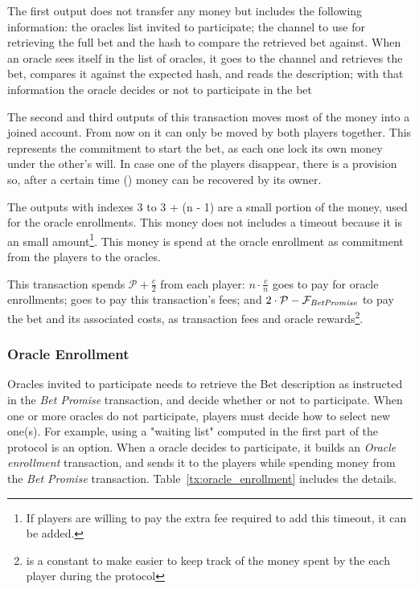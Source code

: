 The first output does not transfer any money but includes the following
  information: the oracles list invited to participate; the channel to use for
  retrieving the full bet and the hash to compare the retrieved bet against.
When an oracle sees itself in the list of oracles, it goes to the channel and
  retrieves the bet, compares it against the expected hash, and reads the
  description; with that information the oracle decides or not to participate
  in the bet

The second and third outputs of this transaction moves most of the money into
  a joined account. From now on it can only be moved by both players
  together.
This represents the commitment to start the bet, as each one lock its own money
  under the other's will.
In case one of the players disappear, there is a provision so, after a certain
  time () money can be recovered by its owner.

The outputs with indexes 3 to 3 + (n - 1) are a small portion of the money, used
  for the oracle enrollments.
This money does not includes a timeout because it is an small amount\footnote{If
  players are willing to pay the extra fee required to add this timeout, it can
  be added.}.
This money is spend at the oracle enrollment as commitment from the players to
  the oracles.

This transaction spends $\mathcal{P} + \frac{c}{2}$ from each player:
  $ n \cdot \frac{c}{n}$ goes to pay for oracle enrollments; 
  goes to pay this transaction's fees; and
  $2 \cdot \mathcal{P} - \mathcal{F}_{\mathit{Bet Promise}}$ to pay the bet and its associated
  costs, as transaction fees and oracle rewards\footnote{ is a
  constant to make easier to keep track of the money spent by the each player
  during the protocol}.

\subsubsection{Oracle Enrollment}
Oracles invited to participate needs to retrieve the Bet description as
  instructed in the \textit{Bet Promise} transaction, and decide whether or not
  to participate.
When one or more oracles do not participate, players must decide how to select
  new one(s).
For example, using a "waiting list" computed in the first part of the protocol
  is an option.
When a oracle decides to participate, it builds an \textit{Oracle enrollment}
  transaction, and sends it to the players while spending money from the
  \textit{Bet Promise} transaction. Table~\ref{tx:oracle_enrollment} includes
  the details.

